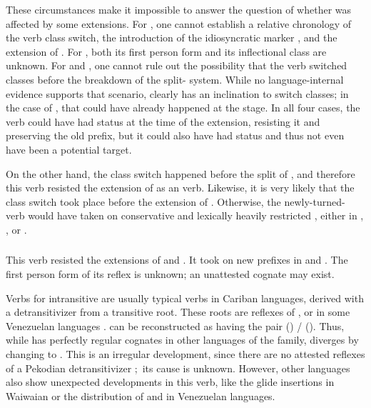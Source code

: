 These circumstances make it impossible to answer the question of whether  was affected by some extensions.
For \PTir, one cannot establish a relative chronology of the verb class switch, the introduction of the idiosyncratic marker , and the extension of .
For \PWai, both its first person form and its inflectional class are unknown.
For \carijo and \yukpa, one cannot rule out the possibility that the verb switched classes before the breakdown of the split- system.
While no language-internal evidence supports that scenario,  clearly has an inclination to switch classes; in the case of \carijo, that could have already happened at the \PTar stage.
In all four cases, the verb could have had  status at the time of the extension, resisting it and preserving the old prefix, but it could also have had  status and thus not even have been a potential target.

On the other hand, the class switch happened before the split of \PTir, and therefore this verb resisted the extension of \akuriyo {} as an  verb.
Likewise, it is very likely that the class switch took place before the extension of \PPek {}.
Otherwise, the newly-turned- verb would have taken on conservative and lexically heavily restricted , either in \PPek, \PXin, or \arara.

\subsubsection{ }
\label{sec:bathe}
This verb resisted the extensions of \PPek {}  and \akuriyo {} .
It took on new  prefixes in \PTir {} and \PWai {}.
The first person form of its \carijo reflex  \parencites[72]{koch1908hiana} is unknown; an unattested \yukpa cognate may exist.

Verbs for intransitive  are usually typical  verbs in Cariban languages, derived with a detransitivizer from a transitive root.
These roots are reflexes of , or  in some Venezuelan languages .
\PPek can be reconstructed as having the pair  () /  ().
Thus, while \PPek {} has perfectly regular cognates in other languages of the family,  diverges by changing  to .
This is an irregular development, since there are no attested reflexes of a Pekodian detransitivizer  \parencite[506]{meira2010origin}; its cause is unknown.
However, other languages also show unexpected developments in this verb, like the glide insertions in Waiwaian or the distribution of  and  in Venezuelan languages.

